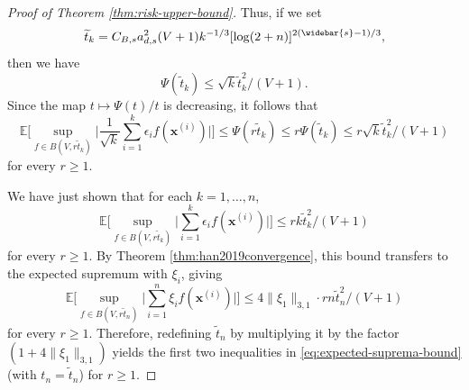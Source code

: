 \documentclass[10pt]{article}
\newcommand{\E}{{\mathbb E}}
\newcommand{\xbf}{{\mathbf{x}}}
\begin{document}
\begin{proof}[Proof of Theorem \ref{thm:risk-upper-bound}]
Thus, if we set
\begin{equation*}
    \widetilde{t}_k = C_{B, s} a_{d, s}^2 (V + 1) k^{-1/3}
    [\log(2 + n)]^{2(\widebar{s} - 1)/3},
\end{equation*}
then we have
\begin{equation*}
    \Psi(\widetilde{t}_k) \le \sqrt{k} \widetilde{t}_k^2 / (V + 1).
\end{equation*}
Since the map $t \mapsto \Psi(t)/t$ is decreasing, it follows that
\begin{equation*}
    \E\Big[\sup_{f \in B(V, r\widetilde{t}_k)} \Big|\frac{1}{\sqrt{k}}
    \sum_{i = 1}^{k} \epsilon_i f(\xbf^{(i)})\Big|\Big]
    \le \Psi(r\widetilde{t}_k) \le r\Psi(\widetilde{t}_k) 
    \le r\sqrt{k} \widetilde{t}_k^2 / (V + 1)
\end{equation*}
for every $r \ge 1$.
    
We have just shown that for each $k = 1, \dots, n$,
\begin{equation*}
    \E\Big[\sup_{f \in B(V, r\widetilde{t}_k)} \Big|
    \sum_{i = 1}^{k} \epsilon_i f(\xbf^{(i)})\Big|\Big]
    \le rk \widetilde{t}_k^2 / (V + 1)
\end{equation*}
for every $r \ge 1$. By Theorem \ref{thm:han2019convergence}, this bound 
transfers to the expected supremum with $\xi_i$, giving
\begin{equation*}
    \E\Big[\sup_{f \in B(V, r\widetilde{t}_n)} \Big|
    \sum_{i = 1}^{n} \xi_i f(\xbf^{(i)})\Big|\Big]
    \le 4 \|\xi_1\|_{3, 1} \cdot rn \widetilde{t}_n^2 / (V + 1)
\end{equation*}
for every $r \ge 1$.
Therefore, redefining $\widetilde{t}_n$ by multiplying it by the factor $(1 + 4 \|\xi_1\|_{3, 1})$
yields the first two inequalities in \eqref{eq:expected-suprema-bound} 
(with $t_n = \widetilde{t}_n$) for $r \ge 1$.
    

\end{proof}
\end{document}
